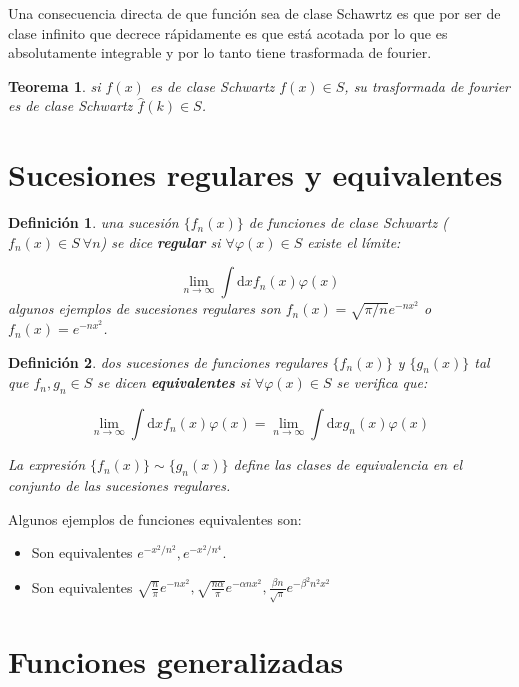 \documentclass[12pt]{book}
\newcommand{\D}{\mathrm{d}}
\newcommand{\hatf}{\widehat{f}}
\newtheorem{theorem}{Teorema}[section]
\newtheorem{definicion}{Definición}[section]
\begin{document}
Una consecuencia directa de que función sea de clase Schawrtz es que por ser de clase infinito que decrece rápidamente es que está acotada por lo que es absolutamente integrable y por lo tanto tiene trasformada de fourier. 

\begin{theorem}
si $f(x)$ es de clase Schwartz $f(x) \in S$, su trasformada de fourier es de clase Schwartz $\hatf (k) \in S$. 
\end{theorem}

\section{Sucesiones regulares y equivalentes}


\begin{definicion}
una sucesión $\{ f_n (x) \}$ de funciones de clase Schwartz ($f_n (x) \in S \ \forall n$) se dice \textbf{regular} si $\forall \varphi (x) \in S$ existe el límite:

$$ \lim_{n \rightarrow \infty} \int \D x f_n (x) \varphi (x)  $$
algunos ejemplos de sucesiones regulares son $f_n (x) = \sqrt{\pi/n} e^{-nx^2}$ o $f_n (x) = e^{-nx^2}$.
\end{definicion}

\begin{definicion}
dos sucesiones de funciones regulares $\{ f_n (x) \}  $ y $ \{ g_n(x) \}$ tal que $f_n, g_n \in S$ se dicen \textbf{equivalentes} si $\forall \varphi (x) \in S$ se verifica que:

$$ \lim_{n \rightarrow \infty} \int \D x f_n (x) \varphi (x) =  \lim_{n \rightarrow \infty} \int \D x g_n (x) \varphi (x)  $$

La expresión  $\{ f_n (x) \}  \sim \{ g_n(x) \}$ define las clases de equivalencia en el conjunto de las sucesiones regulares.
\end{definicion}
Algunos ejemplos de funciones equivalentes son:

\begin{itemize}
\item Son equivalentes $e^{-x^2/n^2}, e^{-x^2/n^4}$.

\item Son equivalentes $\sqrt{\frac{n}{\pi}} e^{-nx^2}, \sqrt{\frac{n \alpha}{\pi}} e^{-\alpha nx^2}, \frac{\beta n}{\sqrt{\pi}} e^{-\beta^2 n^2 x^2}$
\end{itemize}


\section{Funciones generalizadas}
\end{document}
